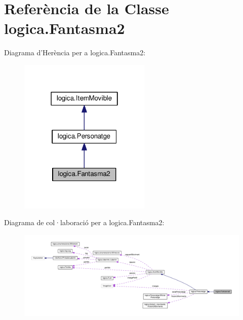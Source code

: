 \hypertarget{classlogica_1_1_fantasma2}{\section{Referència de la Classe logica.\+Fantasma2}
\label{classlogica_1_1_fantasma2}
}


Diagrama d'Herència per a logica.\+Fantasma2\+:\nopagebreak
\begin{figure}[H]
\begin{center}
\leavevmode
\includegraphics[width=178pt]{classlogica_1_1_fantasma2__inherit__graph}
\end{center}
\end{figure}


Diagrama de col·laboració per a logica.\+Fantasma2\+:\nopagebreak
\begin{figure}[H]
\begin{center}
\leavevmode
\includegraphics[width=350pt]{classlogica_1_1_fantasma2__coll__graph}
\end{center}
\end{figure}
